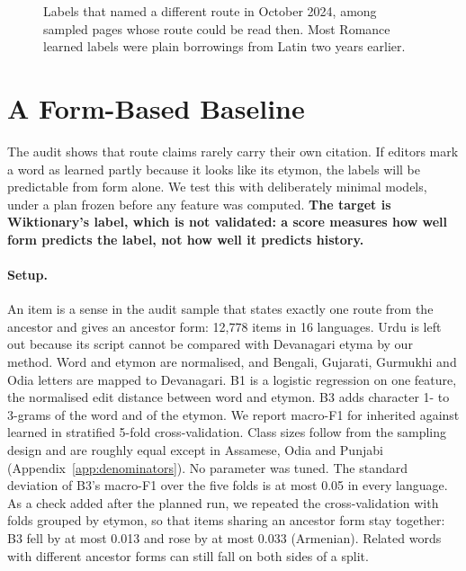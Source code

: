 \documentclass[11pt]{article}
\begin{document}
\begin{figure}[t]
\centering
{}
\caption{Labels that named a different route in October 2024, among sampled pages whose route could be read then. Most Romance learned labels were plain borrowings from Latin two years earlier.}
\label{fig:history}
\end{figure}

\section{A Form-Based Baseline}
\label{sec:baseline}

The audit shows that route claims rarely carry their own citation. If editors mark a word as learned partly because it looks like its etymon, the labels will be predictable from form alone. We test this with deliberately minimal models, under a plan frozen before any feature was computed. \textbf{The target is Wiktionary's label, which is not validated: a score measures how well form predicts the label, not how well it predicts history.}

\paragraph{Setup.} An item is a sense in the audit sample that states exactly one route from the ancestor and gives an ancestor form: 12,778 items in 16 languages. Urdu is left out because its script cannot be compared with Devanagari etyma by our method. Word and etymon are normalised, and Bengali, Gujarati, Gurmukhi and Odia letters are mapped to Devanagari. B1 is a logistic regression on one feature, the normalised edit distance between word and etymon. B3 adds character 1- to 3-grams of the word and of the etymon. We report macro-F1 for inherited against learned in stratified 5-fold cross-validation. Class sizes follow from the sampling design and are roughly equal except in Assamese, Odia and Punjabi (Appendix~\ref{app:denominators}). No parameter was tuned. The standard deviation of B3's macro-F1 over the five folds is at most 0.05 in every language. As a check added after the planned run, we repeated the cross-validation with folds grouped by etymon, so that items sharing an ancestor form stay together: B3 fell by at most 0.013 and rose by at most 0.033 (Armenian). Related words with different ancestor forms can still fall on both sides of a split.
\end{document}
